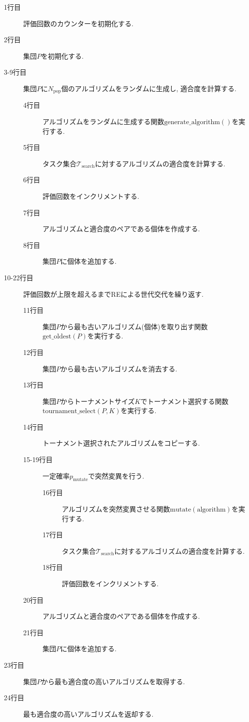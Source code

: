 \documentclass[11pt,oneside,openany,report]{jsbook}
\begin{document}
\begin{description}
  \item[1行目] 評価回数のカウンターを初期化する.
  \item[2行目] 集団$P$を初期化する.
  \item[3-9行目] 集団$P$に$N_\mathrm{pop}$個のアルゴリズムをランダムに生成し, 適合度を計算する.
  \begin{description}
    \item[4行目] アルゴリズムをランダムに生成する関数$\mathrm{generate\_algorithm}()$を実行する.
    \item[5行目] タスク集合$\mathcal{T_\mathrm{search}}$に対するアルゴリズムの適合度を計算する.
    \item[6行目] 評価回数をインクリメントする.
    \item[7行目] アルゴリズムと適合度のペアである個体を作成する.
    \item[8行目] 集団$P$に個体を追加する.
  \end{description}
  \item[10-22行目] 評価回数が上限を超えるまでREによる世代交代を繰り返す.
  \begin{description}
    \item[11行目] 集団$P$から最も古いアルゴリズム(個体)を取り出す関数$\mathrm{get\_oldest}(P)$を実行する.
    \item[12行目] 集団$P$から最も古いアルゴリズムを消去する.
    \item[13行目] 集団$P$からトーナメントサイズ$K$でトーナメント選択する関数$\mathrm{tournament\_select}(P, K)$を実行する.
    \item[14行目] トーナメント選択されたアルゴリズムをコピーする.
    \item[15-19行目] 一定確率$p_\mathrm{mutate}$で突然変異を行う.
    \begin{description}
      \item[16行目] アルゴリズムを突然変異させる関数$\mathrm{mutate}(\mathrm{algorithm})$を実行する.
      \item[17行目] タスク集合$\mathcal{T_\mathrm{search}}$に対するアルゴリズムの適合度を計算する.
      \item[18行目] 評価回数をインクリメントする.
    \end{description}
    \item[20行目] アルゴリズムと適合度のペアである個体を作成する.
    \item[21行目] 集団$P$に個体を追加する.
  \end{description}
  \item[23行目] 集団$P$から最も適合度の高いアルゴリズムを取得する.
  \item[24行目] 最も適合度の高いアルゴリズムを返却する.
\end{description}
\end{document}
